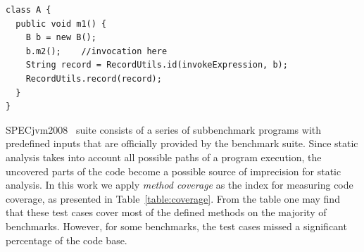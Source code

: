 \documentclass{fac}
\begin{document}
\begin{minipage}{\linewidth}
\vspace{10pt}
\begin{lstlisting}[caption={Example code after our instrumentation},label={lst:after-instru}]
class A {
  public void m1() {
    B b = new B();
    b.m2();    //invocation here
    String record = RecordUtils.id(invokeExpression, b);
    RecordUtils.record(record);
  }
}
\end{lstlisting}
\end{minipage}

SPECjvm2008~\cite{specjvm} suite consists of a series of subbenchmark programs with predefined inputs that are officially provided by the benchmark suite. Since static analysis takes into account all possible paths of a program execution, the uncovered parts of the code become a possible source of imprecision for static analysis. In this work we apply \emph{method coverage} as the index for measuring code coverage, as presented in Table~\ref{table:coverage}. From the table one may find that these test cases cover most of the defined methods on the majority of benchmarks. However, for some benchmarks, the test cases missed a significant percentage of the code base. %
\end{document}
